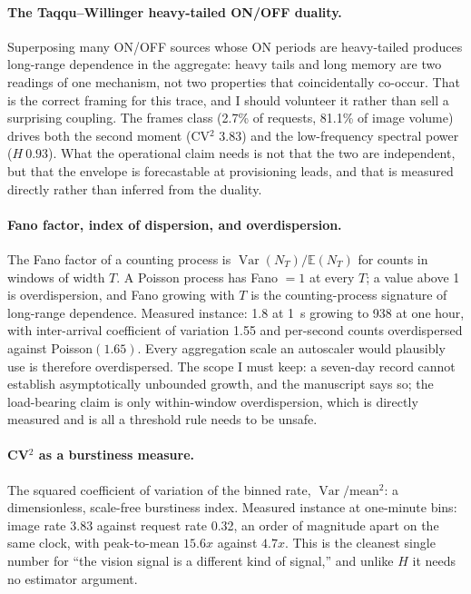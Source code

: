 \documentclass[11pt,a4paper]{article}
\def\times{x}\def\rho{rho}\def\approx{~}\def\leq{<=}\def\geq{>=}%
\def\emph#1{#1}\def\texttt#1{#1}%
\begin{document}
\paragraph{The Taqqu--Willinger heavy-tailed ON/OFF duality.} Superposing
many ON/OFF sources whose ON periods are heavy-tailed produces long-range
dependence in the aggregate: heavy tails and long memory are two readings of
one mechanism, not two properties that coincidentally co-occur. That is the
correct framing for this trace, and I should volunteer it rather than sell a
surprising coupling. The frames class (2.7\% of requests, 81.1\% of image
volume) drives \emph{both} the second moment (CV$^2$ 3.83) and the
low-frequency spectral power ($H \approx 0.93$). What the operational claim
needs is not that the two are independent, but that the envelope is
\emph{forecastable} at provisioning leads, and that is measured directly
rather than inferred from the duality.

\paragraph{Fano factor, index of dispersion, and overdispersion.} The Fano
factor of a counting process is $\operatorname{Var}(N_T)/\mathbb{E}(N_T)$ for
counts in windows of width $T$. A Poisson process has Fano $=1$ at
\emph{every} $T$; a value above 1 is overdispersion, and Fano growing with
$T$ is the counting-process signature of long-range dependence. Measured
instance: 1.8 at \SI{1}{\second} growing to 938 at one hour, with
inter-arrival coefficient of variation 1.55 and per-second counts
overdispersed against Poisson$(1.65)$. Every aggregation scale an autoscaler
would plausibly use is therefore overdispersed. The scope I must keep: a
seven-day record cannot establish asymptotically unbounded growth, and the
manuscript says so; the load-bearing claim is only \emph{within-window}
overdispersion, which is directly measured and is all a threshold rule needs
to be unsafe.

\paragraph{CV$^2$ as a burstiness measure.} The squared coefficient of
variation of the binned rate, $\operatorname{Var}/\text{mean}^2$: a
dimensionless, scale-free burstiness index. Measured instance at one-minute
bins: image rate 3.83 against request rate 0.32, an order of magnitude apart
on the same clock, with peak-to-mean $15.6\times$ against $4.7\times$. This
is the cleanest single number for ``the vision signal is a different kind of
signal,'' and unlike $H$ it needs no estimator argument.
\end{document}
